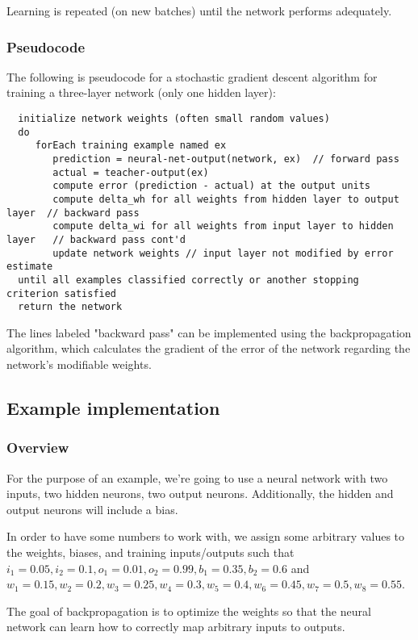 \documentclass[a4paper]{article}
\begin{document}
Learning is repeated (on new batches) until the network performs adequately.

\subsubsection{Pseudocode}
The following is pseudocode for a stochastic gradient descent algorithm for training a three-layer network (only one hidden layer):
\begin{verbatim}
  initialize network weights (often small random values)
  do
     forEach training example named ex
        prediction = neural-net-output(network, ex)  // forward pass
        actual = teacher-output(ex)
        compute error (prediction - actual) at the output units
        compute delta_wh for all weights from hidden layer to output layer  // backward pass
        compute delta_wi for all weights from input layer to hidden layer   // backward pass cont'd
        update network weights // input layer not modified by error estimate
  until all examples classified correctly or another stopping criterion satisfied
  return the network
 \end{verbatim}

The lines labeled "backward pass" can be implemented using the backpropagation algorithm, which calculates the gradient of the error of the network regarding the network's modifiable weights\cite{Werbos:1994:RBO:175610}.

\subsection{Example implementation}
\subsubsection{Overview}
For the purpose of an example, we're going to use a neural network with two inputs, two hidden neurons, two output neurons. Additionally, the hidden and output neurons will include a bias.\cite{Mazur}

In order to have some numbers to work with, we assign some arbitrary values to the weights, biases, and training inputs/outputs such that $i_1=0.05, i_2=0.1, o_1=0.01, o_2=0.99, b_1=0.35, b_2=0.6$ and $w_1=0.15, w_2=0.2, w_3=0.25, w_4=0.3, w_5=0.4, w_6=0.45, w_7=0.5, w_8=0.55$.

The goal of backpropagation is to optimize the weights so that the neural network can learn how to correctly map arbitrary inputs to outputs.
\end{document}
